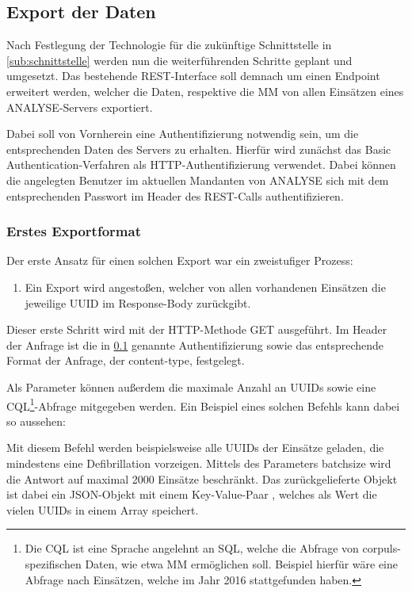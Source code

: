 \subsection{Export der Daten} %
\label{sub:export}
Nach Festlegung der Technologie für die zukünftige Schnittstelle in \ref{sub:schnittstelle} werden nun die weiterführenden Schritte geplant und umgesetzt.
Das bestehende \gls{REST}-Interface soll demnach um einen Endpoint erweitert werden, welcher die Daten, respektive die \gls{MM} von allen Einsätzen eines \gls{ANALYSE}-Servers exportiert.

Dabei soll von Vornherein eine Authentifizierung notwendig sein, um die entsprechenden Daten des Servers zu erhalten.
Hierfür wird zunächst das \glqq Basic Authentication\grqq-Verfahren als HTTP-Authentifizierung verwendet. 
Dabei können die angelegten Benutzer im aktuellen Mandanten von \gls{ANALYSE} sich mit dem entsprechenden Passwort im Header des \gls{REST}-Calls authentifizieren.

\subsubsection{Erstes Exportformat}
\label{subsub:1stexport}
Der erste Ansatz für einen solchen Export war ein zweistufiger Prozess:
\begin{enumerate}
\item Ein Export wird angestoßen, welcher von allen vorhandenen Einsätzen die jeweilige \gls{UUID} im Response-Body zurückgibt.
\end{enumerate}

Dieser erste Schritt wird mit der HTTP-Methode \glqq GET\grqq{} ausgeführt.
Im Header der Anfrage ist die in \ref{sub:export} genannte Authentifizierung sowie das entsprechende Format der Anfrage, der \glqq content-type\grqq, festgelegt.

Als Parameter können außerdem die maximale Anzahl an UUIDs sowie eine \gls{CQL}\footnote{Die \gls{CQL} ist eine \glqq Sprache\grqq{} angelehnt an SQL, welche die Abfrage von corpuls-spezifischen Daten, wie etwa \gls{MM} ermöglichen soll. Beispiel hierfür wäre eine Abfrage nach Einsätzen, welche im Jahr 2016 stattgefunden haben.}-Abfrage mitgegeben werden.
Ein Beispiel eines solchen Befehls kann dabei so aussehen:


Mit diesem Befehl werden beispielsweise alle UUIDs der Einsätze geladen, die mindestens eine Defibrillation vorzeigen. 
Mittels des Parameters \glqq batchsize\grqq{} wird die Antwort auf maximal 2000 Einsätze beschränkt.
Das zurückgelieferte Objekt ist dabei ein JSON-Objekt mit einem Key-Value-Paar , welches als Wert die vielen \gls{UUID}s in einem Array speichert.

